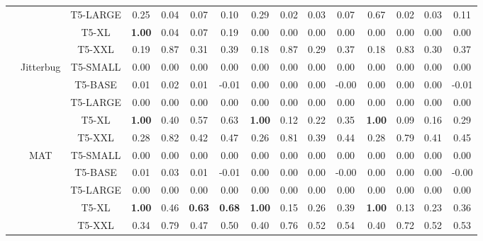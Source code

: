 \begin{table}[ht!]
\begin{adjustbox}{max width=\textwidth, max height=\textheight}
\begin{tabular}{ccccccccccccccc}
& & T5-LARGE  & 0.25 & 0.04 & 0.07 & 0.10  & 0.29 & 0.02 & 0.03 & 0.07  & 0.67 & 0.02 & 0.03 & 0.11  \\
& & T5-XL  & \textbf{1.00} & 0.04 & 0.07 & 0.19  & 0.00 & 0.00 & 0.00 & 0.00  & 0.00 & 0.00 & 0.00 & 0.00  \\
& & T5-XXL  & 0.19 & 0.87 & 0.31 & 0.39  & 0.18 & 0.87 & 0.29 & 0.37  & 0.18 & 0.83 & 0.30 & 0.37  \\
\cmidrule(lr){2-15}
&\multirow{5}{*}{\centering Jitterbug} & T5-SMALL  & 0.00 & 0.00 & 0.00 & 0.00  & 0.00 & 0.00 & 0.00 & 0.00  & 0.00 & 0.00 & 0.00 & 0.00  \\
& & T5-BASE  & 0.01 & 0.02 & 0.01 & -0.01  & 0.00 & 0.00 & 0.00 & -0.00  & 0.00 & 0.00 & 0.00 & -0.01  \\
& & T5-LARGE  & 0.00 & 0.00 & 0.00 & 0.00  & 0.00 & 0.00 & 0.00 & 0.00  & 0.00 & 0.00 & 0.00 & 0.00  \\
& & T5-XL  & \textbf{1.00} & 0.40 & 0.57 & 0.63  & \textbf{1.00} & 0.12 & 0.22 & 0.35  & \textbf{1.00} & 0.09 & 0.16 & 0.29  \\
& & T5-XXL  & 0.28 & 0.82 & 0.42 & 0.47  & 0.26 & 0.81 & 0.39 & 0.44  & 0.28 & 0.79 & 0.41 & 0.45  \\
\cmidrule(lr){2-15}
&\multirow{5}{*}{\centering MAT} & T5-SMALL  & 0.00 & 0.00 & 0.00 & 0.00  & 0.00 & 0.00 & 0.00 & 0.00  & 0.00 & 0.00 & 0.00 & 0.00  \\
& & T5-BASE  & 0.01 & 0.03 & 0.01 & -0.01  & 0.00 & 0.00 & 0.00 & -0.00  & 0.00 & 0.00 & 0.00 & -0.00  \\
& & T5-LARGE  & 0.00 & 0.00 & 0.00 & 0.00  & 0.00 & 0.00 & 0.00 & 0.00  & 0.00 & 0.00 & 0.00 & 0.00  \\
& & T5-XL  & \textbf{1.00} & 0.46 & \textbf{0.63} & \textbf{0.68}  & \textbf{1.00} & 0.15 & 0.26 & 0.39  & \textbf{1.00} & 0.13 & 0.23 & 0.36  \\
& & T5-XXL  & 0.34 & 0.79 & 0.47 & 0.50  & 0.40 & 0.76 & 0.52 & 0.54  & 0.40 & 0.72 & 0.52 & 0.53  \\
\bottomrule


\end{tabular}%
\end{adjustbox}
\end{table}
